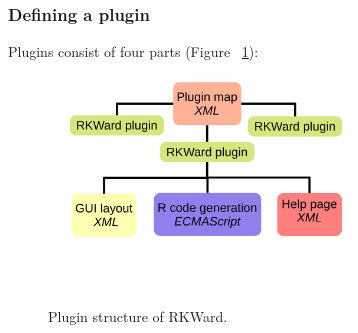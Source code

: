 \subsubsection{Defining a plugin}
\label{sec:technical_plugins_defining}
Plugins consist of four parts \citep[see Section~\ref{sec:example_plugin} for an example; for a complete
manual, see][]{Friedrichsmeier2010} (Figure ~\ref{fig:plugin_structure}):

\begin{figure}[htp]
 \centering
 \includegraphics[width=8cm]{../figures/plugin_structure.pdf}
 \caption{Plugin structure of RKWard.}
 \label{fig:plugin_structure}
\end{figure}

